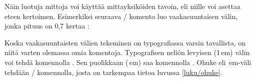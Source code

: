 \begin{koodilohkosis}
\newlength{\omamitta}         %
\setlength{\omamitta}{2.3em}  %
\addtolength{\omamitta}{1em}  %
\addtolength{\omamitta}{-1em} %
\end{koodilohkosis}

\noindent
Näin luotuja mittoja voi käyttää mittayksiköiden tavoin, eli niille voi
asettaa eteen kertoimen. Esimerkiksi seuraava \-/
komento luo vaakasuuntaisen välin, jonka pituus on 0,7 kertaa
:

\begin{koodilohkosis}
\hspace{0.7\omamitta}
\end{koodilohkosis}

\noindent
Koska vaakasuuntaisten välien tekeminen on typografiassa varsin
tavallista, on niitä varten olemassa omia komentoja. Typografisen neliön
levyisen (1\,em) välin voi tehdä komennolla . Sen
puolikkaan (\,em) saa komennolla .
Ohuke eli \,em-väli tehdään \komentom{,}\-/ komennolla,
josta on tarkempaa tietoa luvussa \ref{luku/ohuke}.

